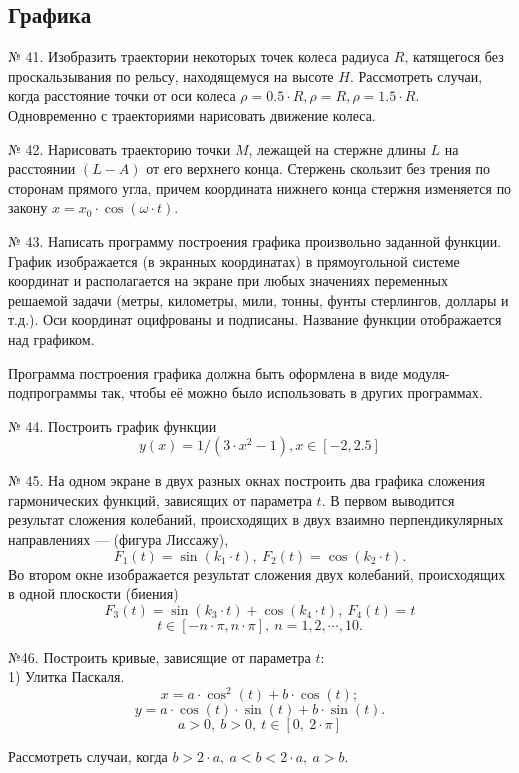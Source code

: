 {\subsection{Графика}

№ 41. Изобразить траектории некоторых точек колеса радиуса $R$, катящегося без проскальзывания по рельсу, находящемуся на высоте $H$. Рассмотреть случаи, когда расстояние точки от оси колеса $\rho = 0.5\cdot R, \rho = R, \rho = 1.5\cdot R$. Одновременно с траекториями нарисовать движение колеса.

№ 42. Нарисовать траекторию точки $M$, лежащей на стержне длины $L$ на расстоянии $(L- A)$ от его верхнего конца. Стержень скользит без трения по сторонам прямого угла, причем координата нижнего конца стержня изменяется по закону $x = x_0\cdot\cos(\omega\cdot t)$.

№ 43. Написать программу построения графика произвольно заданной функции. График изображается (в экранных координатах) в прямоугольной системе координат и располагается на экране при любых значениях переменных решаемой задачи (метры, километры, мили, тонны, фунты стерлингов, доллары и т.д.). Оси координат оцифрованы и подписаны. Название функции отображается над графиком.

Программа построения графика должна быть оформлена в виде модуля-подпрограммы так, чтобы её можно было использовать в других программах.

№ 44. Построить график функции
$$y(x)= 1/(3\cdot x^2-1), x \in[-2,2.5]$$

№ 45. На одном экране в двух разных окнах построить два графика сложения гармонических функций, зависящих от параметра $t$. В первом выводится результат сложения колебаний, происходящих в двух взаимно перпендикулярных направлениях --- (фигура Лиссажу),
$$F_1(t) = \sin(k_1\cdot t), \:F_2(t) = \cos(k_2\cdot t).$$
Во втором окне изображается результат сложения двух колебаний, происходящих в одной плоскости (биения)
$$F_3(t) = \sin(k_3\cdot t) + \cos(k_4\cdot t), \:F_4(t) = t$$
$$t\in [-n\cdot \pi, n\cdot \pi], \:n = 1,2,\cdots, 10.  $$

№46. Построить кривые, зависящие от параметра $t:$\\

 1) Улитка Паскаля.\\
$$x = a\cdot \cos^2(t) + b\cdot \cos(t);$$
$$ y = a\cdot \cos(t)\cdot\sin(t) + b\cdot\sin(t).$$
$$a > 0, \:b > 0,\: t \in[0,\:2\cdot \pi]$$

Рассмотреть случаи, когда $b > 2\cdot a, \: a < b < 2\cdot a, \: a > b.$

}
